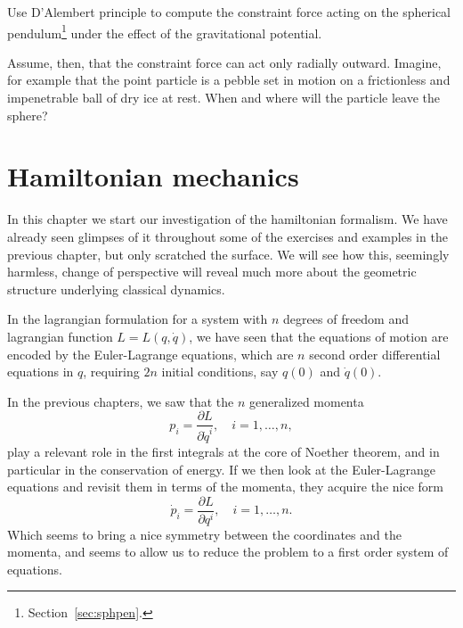\documentclass[english,fontsize=11pt,paper=a5,oneside]{scrbook}
\theoremstyle{definition}
\newenvironment{exercise}
  {\pushQED{\qed}\renewcommand{\qedsymbol}{$\maltese$}\exercisex}
  {\popQED\endexercisex}
\begin{document}
\begin{exercise}
    Use D'Alembert principle to compute the constraint force acting on the spherical pendulum\footnote{Section~\ref{sec:sphpen}.} under the effect of the gravitational potential.
    
    Assume, then, that the constraint force can act only radially outward. Imagine, for example that the point particle is a pebble set in motion on a frictionless and impenetrable ball of dry ice at rest.
    When and where will the particle leave the sphere?
\end{exercise}


\chapter{Hamiltonian mechanics}

In this chapter we start our investigation of the hamiltonian formalism.
We have already seen glimpses of it throughout some of the exercises and examples in the previous chapter, but only scratched the surface.
We will see how this, seemingly harmless, change of perspective will reveal much more about the geometric structure underlying classical dynamics.

In the lagrangian formulation for a system with $n$ degrees of freedom and lagrangian function $L=L(q, \dot q)$, we have seen that the equations of motion are encoded by the Euler-Lagrange equations, which are $n$ second order differential equations in $q$, requiring $2n$ initial conditions, say $q(0)$ and $\dot q(0)$.

In the previous chapters, we saw that the $n$ generalized momenta
\begin{equation}
    p_i = \frac{\partial L}{\partial \dot q^i}, \quad i=1,\ldots,n,
\end{equation}
play a relevant role in the first integrals at the core of Noether theorem, and in particular in the conservation of energy.
If we then look at the Euler-Lagrange equations and revisit them in terms of the momenta, they acquire the nice form
\begin{equation}
    \dot p_i = \frac{\partial L}{\partial q^i}, \quad i=1,\ldots,n.
\end{equation}
Which seems to bring a nice symmetry between the coordinates and the momenta, and seems to allow us to reduce the problem to a first order system of equations.
\end{document}
